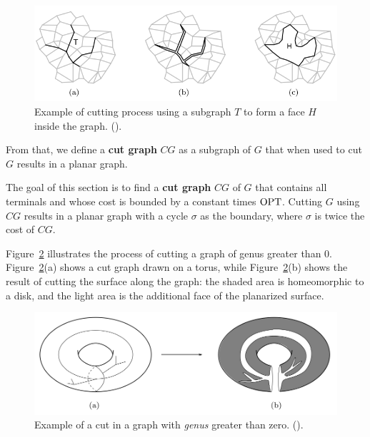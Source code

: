 \begin{figure}[h]
    \centering
    \includegraphics[scale=0.7]{imgs/cut_graph_example.png}
    \caption {Example of cutting process using a subgraph \(T\) to form a face \(H\) inside the graph. (\cite{Borradaile2012}).}
    \label{fig:cut_graph_example}
\end{figure}


From that, we define a \textbf{cut graph} \(CG\) as a subgraph of \(G\) that when used to cut \(G\) results in a planar graph.

The goal of this section is to find a \textbf{cut graph} \(CG\) of \(G\) that contains all terminals and whose cost is bounded by a constant times \(\operatorname{\textrm{OPT}}\). Cutting \(G\) using \(CG\) results in a planar graph with a cycle \(\sigma\) as the boundary, where \(\sigma\) is twice the cost of \(CG\).

Figure~\ref{fig:mortar5} illustrates the process of cutting a graph of genus greater than 0.  Figure~\ref{fig:mortar5}(a) shows a cut graph drawn on a torus, while Figure~\ref{fig:mortar5}(b) shows the result of cutting the surface along the graph: the shaded area is homeomorphic to a disk, and the light area is the additional face of the planarized surface.

\begin{figure}[h]
    \centering
    \includegraphics[scale=0.45]{imgs/mortar5.png}
    \caption {Example of a cut in a graph with \textit{genus} greater than zero. (\cite{Borradaile2012}).}
    \label{fig:mortar5}
\end{figure}


